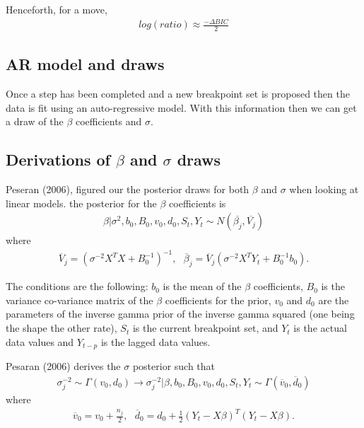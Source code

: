 \documentclass[submit]{smj}
\begin{document}
Henceforth, for a move, 
\begin{align*}
log(ratio) \approx \frac{- \Delta BIC}{2} 
\end{align*}

\subsection{AR model and draws}
Once a step has been completed and a new breakpoint set is proposed then the data is fit using an auto-regressive model.  With this information then we can get a draw of the $\beta$ coefficients and $\sigma$.

\subsection{Derivations of $\beta$ and $\sigma$ draws}

Peseran (2006), figured our the posterior draws for both $\beta$ and $\sigma$ when looking at linear models.  the posterior for the $\beta$ coefficients is 
\begin{align*}
\beta | \sigma^2, b_0, B_0, v_0, d_0 , S_{t}, Y_{t} \sim N( \overline{\beta_j } , \overline{V_j} )
\end{align*}
where 
\begin{align*}
\overline{V}_j = (\sigma^{-2}X^T X + B_0^{-1})^{-1}, \ \ \  \overline{\beta}_j = \overline{V}_j(\sigma^{-2} X^T Y_t + B_0^{-1}b_0).
\end{align*}

The conditions are the following: $b_0$ is the mean of the $\beta$ coefficients, $B_0$ is the variance co-variance matrix of the $\beta$ coefficients for the prior, $v_0$ and $d_0$ are the parameters of the inverse gamma prior of the inverse gamma squared (one being the shape the other rate), $S_t$ is the current breakpoint set, and $Y_t$ is the actual data values and $Y_{t-p}$ is the lagged data values. 


Pesaran (2006) derives the $\sigma$ posterior such that 
\begin{align*}
\sigma_j^{-2} \sim  \Gamma(v_0, d_0) \longrightarrow \sigma^{-2}_j | \beta, b_0, B_0, v_0, d_0 , S_{t}, Y_{t} \sim \Gamma ( \overline{v}_0,  \overline{d}_0)
\end{align*}
where 
\begin{align*}
\overline{v}_0 = v_0 + \frac{n_j}{2} , \ \ \  \overline{d}_0 = d_0 + \frac{1}{2}(Y_t-X\beta)^T(Y_t- X \beta).
\end{align*}
\end{document}
